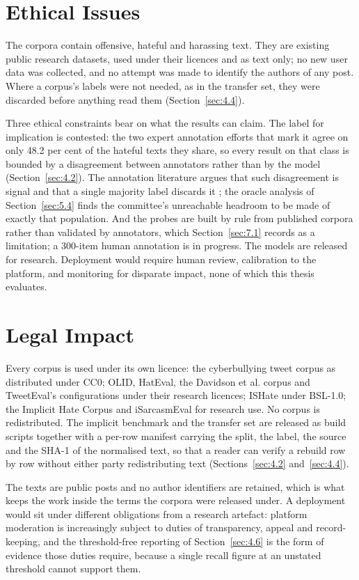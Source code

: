 \section{Ethical Issues}
\label{sec:ethics}
The corpora contain offensive, hateful and harassing text. They are existing public research datasets,
used under their licences and as text only; no new user data was collected, and no attempt was made to
identify the authors of any post. Where a corpus's labels were not needed, as in the transfer set,
they were discarded before anything read them (Section~\ref{sec:4.4}).

Three ethical constraints bear on what the results can claim. The label for implication is contested:
the two expert annotation efforts that mark it agree on only 48.2 per cent of the hateful texts they
share, so every result on that class is bounded by a disagreement between annotators rather than by
the model (Section~\ref{sec:4.2}). The annotation literature argues that such disagreement is signal
and that a single majority label discards it
\cite{uma2021learning, davani2022dealing, plank2022problem, peterson2019human}; the oracle analysis of
Section~\ref{sec:5.4} finds the committee's unreachable headroom to be made of exactly that
population. And the probes are built by rule from published corpora rather than validated by
annotators, which Section~\ref{sec:7.1} records as a limitation; a 300-item human annotation is in
progress. The models are released for research. Deployment would require human review, calibration to
the platform, and monitoring for disparate impact, none of which this thesis evaluates.

\section{Legal Impact}
\label{sec:legal}
Every corpus is used under its own licence: the cyberbullying tweet corpus as distributed under CC0;
OLID, HatEval, the Davidson et al. corpus and TweetEval's configurations under their research licences;
ISHate under BSL-1.0; the Implicit Hate Corpus and iSarcasmEval for research use. No corpus is
redistributed. The implicit benchmark and the transfer set are released as build scripts together with
a per-row manifest carrying the split, the label, the source and the SHA-1 of the normalised text, so
that a reader can verify a rebuild row by row without either party redistributing text
(Sections~\ref{sec:4.2} and~\ref{sec:4.4}).

The texts are public posts and no author identifiers are retained, which is what keeps the work inside
the terms the corpora were released under. A deployment would sit under different obligations from a
research artefact: platform moderation is increasingly subject to duties of transparency, appeal and
record-keeping, and the threshold-free reporting of Section~\ref{sec:4.6} is the form of evidence
those duties require, because a single recall figure at an unstated threshold cannot support them.

